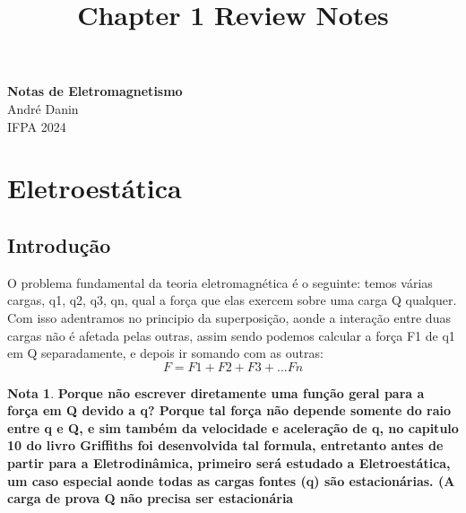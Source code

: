 \documentclass[11pt]{article}
\theoremstyle{definition}
\newtheorem{note}{Nota}
\begin{document}
\setcounter{section}{0}
\title{Chapter 1 Review Notes}

\thispagestyle{empty}

\begin{center}
{\LARGE \bf Notas de Eletromagnetismo}\\
{\large André Danin}\\
IFPA 2024
\end{center}
\section{Eletroestática}
\subsection{Introdução}
O problema fundamental da teoria eletromagnética é o seguinte: temos várias cargas, q1, q2, q3, qn, qual a força que elas exercem sobre uma carga Q qualquer. Com isso adentramos no principio da superposição, aonde a interação entre duas cargas não é afetada pelas outras, assim sendo podemos calcular a força F1 de q1 em Q separadamente, e depois ir somando com as outras: 
\begin{equation}
F=F1+F2+F3+...Fn    
\end{equation}
\begin{note}
\textbf{Porque não escrever diretamente uma função geral para a força em Q devido a q? Porque tal força não depende somente do raio entre q e Q, e sim também da velocidade e aceleração de q, no capitulo 10 do livro Griffiths foi desenvolvida tal formula, entretanto antes de partir para a Eletrodinâmica, primeiro será estudado a Eletroestática, um caso especial aonde todas as cargas fontes (q) são estacionárias. (A carga de prova Q não precisa ser estacionária}
\end{note}
\end{document}
